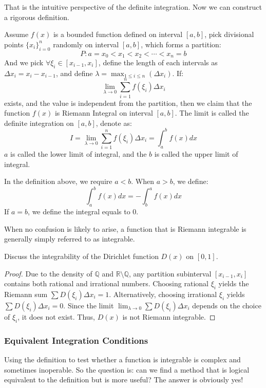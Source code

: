 That is the intuitive perspective of the definite integration. Now we can construct a rigorous definition.

\begin{definition}
Assume $f(x)$ is a bounded function defined on interval $[a,b]$, pick divisional points $\{x_i\}^{n}_{i=0}$ randomly on interval $[a,b]$, which forms a partition:
\[
P:a=x_0<x_1<x_2< \cdots <x_n=b
\]
And we pick $\forall \xi_i \in [x_{i-1},x_i]$, define the length of each intervals as $\Delta x_i = x_i - x_{i-1}$, and define $\lambda = \max_{1 \leq i \leq n}(\Delta x_i) $. If:
\[
\lim_{\lambda \to 0} \sum_{i=1}^{n} f(\xi_i)\Delta x_i
\]
exists, and the value is independent from the partition, then we claim that the function $f(x)$ is Riemann Integral on interval $[a,b]$. The limit is called the definite integration on $[a,b]$, denote as:
\[
I = \lim_{\lambda \to 0} \sum_{i=1}^{n}f(\xi_i) \Delta x_i = \int_a^b f(x) dx
\]
$a$ is called the lower limit of integral, and the $b$ is called the upper limit of integral.
\end{definition}

In the definition above, we require $a<b$. When $a>b$, we define:
\[\int_{a}^{b}f(x)dx = -\int_{b}^{a}f(x)dx\]
If $a=b$, we define the integral equals to $0$.

When no confusion is likely to arise, a function that is Riemann integrable is generally simply referred to as integrable.

\begin{example}
Discuss the integrability of the Dirichlet function $D(x)$ on $[0,1]$.
\begin{proof}
Due to the density of $\mathbb{Q}$ and $\mathbb{R}\setminus\mathbb{Q}$, any partition subinterval $[x_{i-1},x_i]$ contains both rational and irrational numbers. 
Choosing rational $\xi_i$ yields the Riemann sum $\sum D(\xi_i)\Delta x_i = 1$. 
Alternatively, choosing irrational $\xi_i$ yields $\sum D(\xi_i)\Delta x_i = 0$. 
Since the limit $\lim_{\lambda \to 0} \sum D(\xi_i)\Delta x_i$ depends on the choice of $\xi_i$, it does not exist. Thus, $D(x)$ is not Riemann integrable.
\end{proof}
\end{example}

\subsubsection{Equivalent Integration Conditions}

Using the definition to test whether a function is integrable is complex and sometimes inoperable. So the question is: can we find a method that is logical equivalent to the definition but is more useful? The answer is obviously yes!

